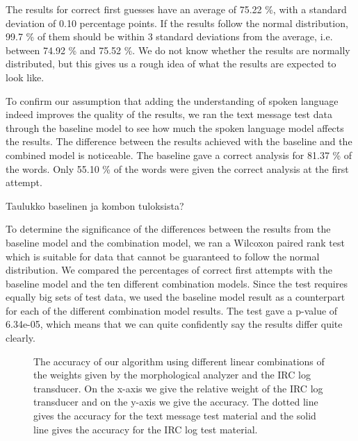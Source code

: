 \documentclass[a4paper,conference]{IEEEtran}
\begin{document}
The results for correct first guesses have an average of 75.22 \%, with a standard deviation of 0.10 percentage points. If the results follow the normal distribution, 99.7 \% of them should be within 3 standard deviations from the average, i.e. between 74.92 \% and 75.52 \%. We do not know whether the results are normally distributed, but this gives us a rough idea of what the results are expected to look like.


To confirm our assumption that adding the understanding of spoken language indeed improves the quality of the results, we ran the text message test data through the baseline model to see how much the spoken language model affects the results. The difference between the results achieved with the baseline and the combined model is noticeable. The baseline gave a correct analysis for 81.37 \% of the words. Only 55.10 \% of the words were given the correct analysis at the first attempt.

Taulukko baselinen ja kombon tuloksista?

To determine the significance of the differences between the results from the baseline model and the combination model, we ran a Wilcoxon paired rank test which is suitable for data that cannot be guaranteed to follow the normal distribution. We compared the percentages of correct first attempts with the baseline model and the ten different combination models. Since the test requires equally big sets of test data, we used the baseline model result as a counterpart for each of the different combination model results. The test gave a p-value of 6.34e-05, which means that we can quite confidently say the results differ quite clearly.



\begin{figure*}[!t]
\centerline{
\hfil
{}}
\caption{The accuracy of our algorithm using different linear combinations of the weights given by the morphological analyzer and the IRC log transducer. On the x-axis we give the relative weight of the IRC log transducer and on the y-axis we give the accuracy. The dotted line gives the accuracy for the text message test material and the solid line gives the accuracy for the IRC log test material.}
\label{AccuraciesIRCMaterial}
\end{figure*}
\end{document}

